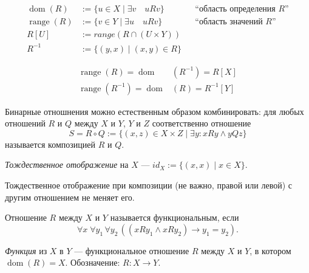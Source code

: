 \documentclass[12pt,a4paper]{article}
\DeclareMathOperator{\dom}{dom}
\DeclareMathOperator{\range}{range}
\begin{document}
    \begin{definition}
        \begin{align*}
            \dom(R) &:= \{u \in X \mid \exists v\quad uRv\}&& \text{``область определения $R$''}\\
            \range(R) &:= \{v \in Y \mid \exists u\quad uRv\}&& \text{``область значений $R$''}\\
            R[U] &:= range(R \cap (U \times Y))\\
            R^{-1} &:= \{(y, x) \mid (x, y) \in R\}
        \end{align*}
    \end{definition}

    \begin{remark}
        \begin{align*}
            \range(R) = \dom&(R^{-1}) = R[X]\\
            \range(R^{-1}) = \dom&(R) = R^{-1}[Y]
        \end{align*}
    \end{remark}

    \begin{definition}
        Бинарные отношнения можно естественным образом комбинировать: для любых отношений $R$ и $Q$ между $X$ и $Y$, $Y$ и $Z$ соответственно отношение
        \[
            S = R \circ Q := \{(x, z) \in X \times Z \mid \exists y: xRy \wedge yQz\}
        \]
        называется композицией $R$ и $Q$.
    \end{definition}

    \begin{definition}
        \emph{Тождественное отображение} на $X$ --- $id_X := \{(x, x) \mid x \in X\}$.
    \end{definition}

    \begin{remark}
        Тождественное отображение при композиции (не важно, правой или левой) с другим отношением не меняет его. 
    \end{remark}

    \begin{definition}
        Отношение $R$ между $X$ и $Y$ называется функциональным, если
        \[
            \forall x\; \forall y_1\, \forall y_2\, ((xRy_1 \wedge xRy_2) \rightarrow y_1 = y_2).
        \]
    \end{definition}

    \begin{definition}
        \emph{Функция} из $X$ в $Y$ --- функциональное отношение $R$ между $X$ и $Y$, в котором $\dom(R)=X$. Обозначение: $R: X \to Y$.
    \end{definition}
\end{document}
